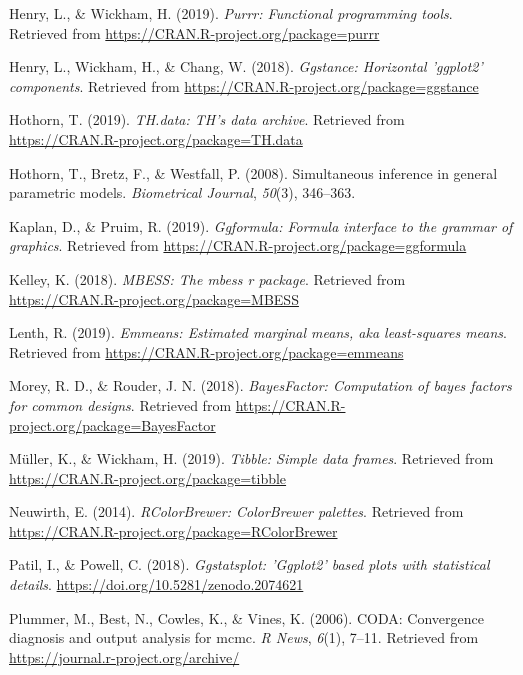 \documentclass[man]{apa6}
\begin{document}
\leavevmode\hypertarget{ref-R-purrr}{}%
Henry, L., \& Wickham, H. (2019). \emph{Purrr: Functional programming tools}. Retrieved from \url{https://CRAN.R-project.org/package=purrr}

\leavevmode\hypertarget{ref-R-ggstance}{}%
Henry, L., Wickham, H., \& Chang, W. (2018). \emph{Ggstance: Horizontal 'ggplot2' components}. Retrieved from \url{https://CRAN.R-project.org/package=ggstance}

\leavevmode\hypertarget{ref-R-TH.data}{}%
Hothorn, T. (2019). \emph{TH.data: TH's data archive}. Retrieved from \url{https://CRAN.R-project.org/package=TH.data}

\leavevmode\hypertarget{ref-R-multcomp}{}%
Hothorn, T., Bretz, F., \& Westfall, P. (2008). Simultaneous inference in general parametric models. \emph{Biometrical Journal}, \emph{50}(3), 346--363.

\leavevmode\hypertarget{ref-R-ggformula}{}%
Kaplan, D., \& Pruim, R. (2019). \emph{Ggformula: Formula interface to the grammar of graphics}. Retrieved from \url{https://CRAN.R-project.org/package=ggformula}

\leavevmode\hypertarget{ref-R-MBESS}{}%
Kelley, K. (2018). \emph{MBESS: The mbess r package}. Retrieved from \url{https://CRAN.R-project.org/package=MBESS}

\leavevmode\hypertarget{ref-R-emmeans}{}%
Lenth, R. (2019). \emph{Emmeans: Estimated marginal means, aka least-squares means}. Retrieved from \url{https://CRAN.R-project.org/package=emmeans}

\leavevmode\hypertarget{ref-R-BayesFactor}{}%
Morey, R. D., \& Rouder, J. N. (2018). \emph{BayesFactor: Computation of bayes factors for common designs}. Retrieved from \url{https://CRAN.R-project.org/package=BayesFactor}

\leavevmode\hypertarget{ref-R-tibble}{}%
Müller, K., \& Wickham, H. (2019). \emph{Tibble: Simple data frames}. Retrieved from \url{https://CRAN.R-project.org/package=tibble}

\leavevmode\hypertarget{ref-R-RColorBrewer}{}%
Neuwirth, E. (2014). \emph{RColorBrewer: ColorBrewer palettes}. Retrieved from \url{https://CRAN.R-project.org/package=RColorBrewer}

\leavevmode\hypertarget{ref-R-ggstatsplot}{}%
Patil, I., \& Powell, C. (2018). \emph{Ggstatsplot: 'Ggplot2' based plots with statistical details}. \url{https://doi.org/10.5281/zenodo.2074621}

\leavevmode\hypertarget{ref-R-coda}{}%
Plummer, M., Best, N., Cowles, K., \& Vines, K. (2006). CODA: Convergence diagnosis and output analysis for mcmc. \emph{R News}, \emph{6}(1), 7--11. Retrieved from \url{https://journal.r-project.org/archive/}
\end{document}
